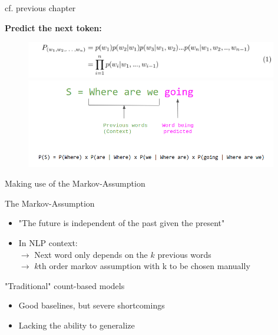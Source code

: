 \begin{vbframe}{cf. previous chapter}
	
\vfill

\textbf{Predict the next token:}

\begin{figure}
	\centering
		\includegraphics[width = 11cm]{figure/language-modeling.png}\\ 
		\includegraphics[width = 11cm]{figure/language-modeling2.png}\\
\end{figure}

\vfill

\end{vbframe}


\begin{frame}{Making use of the Markov-Assumption}

\vfill

\begin{block}{The Markov-Assumption}
    \begin{itemize}
        \item "The future is independent of the past given the present"
        \item In NLP context:\\
        $\rightarrow$ Next word only depends on the $k$ previous words\\
        $\rightarrow$ $k$th order markov assumption with k to be chosen manually
    \end{itemize}
\end{block}
\begin{block}{"Traditional" count-based models}
    \begin{itemize}
        \item Good baselines, but severe shortcomings
        \item Lacking the ability to generalize
    \end{itemize}
\end{block}

\vfill

\end{frame}

